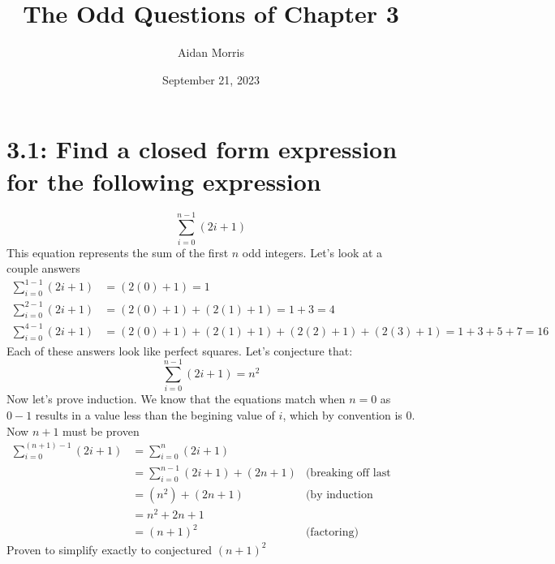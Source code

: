 \documentclass{article}
\title{The Odd Questions of Chapter 3}
\author{Aidan Morris}
\date{September 21, 2023}
\begin{document}
\maketitle
\pagebreak

\section*{3.1: Find a closed form expression for the following expression}
\begin{equation}
    \sum_{i=0}^{n-1} (2i + 1)
\end{equation}
This equation represents the sum of the first $n$ odd integers. Let's look at a couple answers 
\begin{align*}
\sum_{i=0}^{1-1} (2i + 1) &= (2(0) + 1) = 1 \\
\sum_{i=0}^{2-1} (2i + 1) &= (2(0) + 1) + (2(1) + 1) = 1 + 3 = 4 \\
\sum_{i=0}^{4-1} (2i + 1) &= (2(0) + 1) + (2(1) + 1) + (2(2) + 1) + (2(3) + 1) = 1 + 3 + 5 + 7 = 16 
\end{align*}
Each of these answers look like perfect squares. Let's conjecture that:
\begin{equation}
    \sum_{i=0}^{n-1} (2i + 1) = n^2
\end{equation}
Now let's prove induction. We know that the equations match when $n = 0$ as $0 - 1$ results in a value less than the begining value of $i$, which by convention is 0. Now $n + 1$ must be proven
\begin{align*}
  \sum_{i=0}^{(n+1)-1} (2i + 1) &= \sum_{i=0}^{n} (2i + 1) &\\
  &= \sum_{i=0}^{n-1} (2i + 1) + (2n + 1) &\textrm{(breaking off last term)} \\
  &= (n^2) + (2n + 1) &\textrm{(by induction hypothesis)} \\
  &= n^2 + 2n + 1 &\\
  &= (n+1)^2 &\textrm{(factoring)}
\end{align*}
Proven to simplify exactly to conjectured $(n+1)^2$
\end{document}
